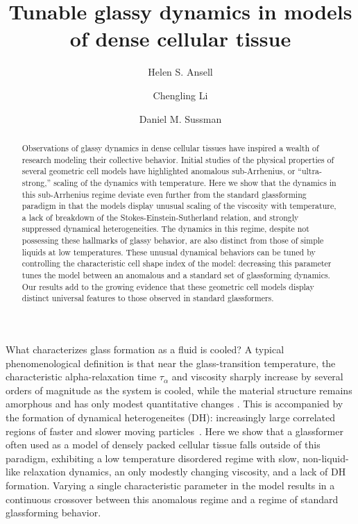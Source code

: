\documentclass[amsmath,amssymb,prl,reprint,twocolumn]{revtex4-2}
\begin{document}
\title{Tunable glassy dynamics in models of dense cellular tissue}


\author{Helen S. Ansell}
\author{Chengling Li}
\author{Daniel M. Sussman}


\begin{abstract} 
Observations of glassy dynamics in dense cellular tissues have inspired a wealth of research modeling their collective behavior. 
Initial studies of the physical properties of several geometric cell models have highlighted anomalous sub-Arrhenius, or ``ultra-strong,'' scaling of the dynamics with temperature.
Here we show that the dynamics in this sub-Arrhenius regime deviate even further from the standard glassforming paradigm in that the models display unusual scaling of the viscosity with temperature, a lack of breakdown of the Stokes-Einstein-Sutherland relation, and strongly suppressed dynamical heterogeneities.
The dynamics in this regime, despite not possessing these hallmarks of glassy behavior, are also distinct from those of simple liquids at low temperatures.
These unusual dynamical behaviors can be tuned by controlling the characteristic cell shape index of the model: decreasing this parameter tunes the model between an anomalous and a standard set of glassforming dynamics.
Our results add to the growing evidence that these geometric cell models display distinct universal features to those observed in standard glassformers.
\end{abstract}


\maketitle

What characterizes glass formation as a fluid is cooled?
A typical phenomenological definition is that near the glass-transition temperature, the characteristic alpha-relaxation time $\tau_{\alpha}$ and viscosity sharply increase by several orders of magnitude as the system is cooled, while the material structure remains amorphous and has only modest quantitative changes \cite{ediger1996supercooled}. 
This is accompanied by the formation of dynamical heterogeneites (DH): increasingly large correlated regions of faster and slower moving particles~\cite{Berthier2011DHBook}.
Here we show that a glassformer often used as a model of densely packed cellular tissue falls outside of this paradigm, exhibiting a low temperature disordered regime with slow, non-liquid-like relaxation dynamics, an only modestly changing viscosity, and a lack of DH formation.
Varying a single characteristic parameter in the model results in a continuous crossover between this anomalous regime and a regime of standard glassforming behavior.
\end{document}
